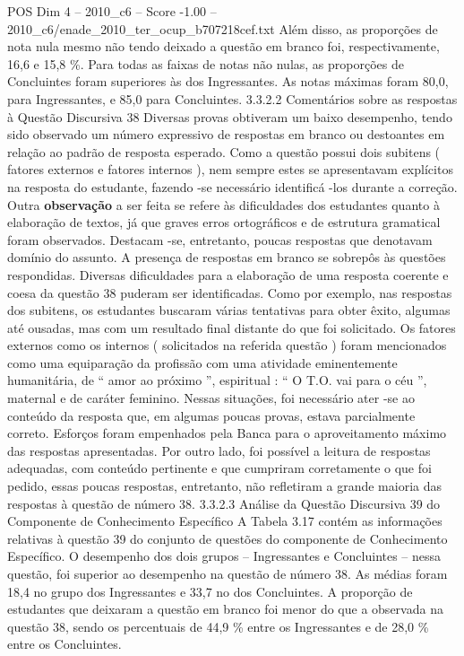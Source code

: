 \begin{textsample}{POS Dim 4 – 2010\_c6 – Score -1.00 – 2010\_c6/enade\_2010\_ter\_ocup\_b707218cef.txt}
Além disso, as proporções de nota nula mesmo não tendo deixado a questão em branco foi, respectivamente, 16,6 e 15,8 \%.
Para todas as faixas de notas não nulas, as proporções de Concluintes foram superiores às dos Ingressantes.
As notas máximas foram 80,0, para Ingressantes, e 85,0 para Concluintes. 3.3.2.2 Comentários sobre as respostas à Questão Discursiva 38 Diversas provas obtiveram um baixo desempenho, tendo sido observado um número expressivo de respostas em branco ou destoantes em relação ao padrão de resposta esperado.
Como a questão possui dois subitens ( fatores externos e fatores internos ), nem sempre estes se apresentavam explícitos na resposta do estudante, fazendo -se necessário identificá -los durante a correção.
Outra \textbf{observação} a ser feita se refere às dificuldades dos estudantes quanto à elaboração de textos, já que graves erros ortográficos e de estrutura gramatical foram observados.
Destacam -se, entretanto, poucas respostas que denotavam domínio do assunto.
A presença de respostas em branco se sobrepôs às questões respondidas.
Diversas dificuldades para a elaboração de uma resposta coerente e coesa da questão 38 puderam ser identificadas.
Como por exemplo, nas respostas dos subitens, os estudantes buscaram várias tentativas para obter êxito, algumas até ousadas, mas com um resultado final distante do que foi solicitado.
Os fatores externos como os internos ( solicitados na referida questão ) foram mencionados como uma equiparação da profissão com uma atividade eminentemente humanitária, de “ amor ao próximo ”, espiritual : “ O T.O. vai para o céu ”, maternal e de caráter feminino.
Nessas situações, foi necessário ater -se ao conteúdo da resposta que, em algumas poucas provas, estava parcialmente correto.
Esforços foram empenhados pela Banca para o aproveitamento máximo das respostas apresentadas.
Por outro lado, foi possível a leitura de respostas adequadas, com conteúdo pertinente e que cumpriram corretamente o que foi pedido, essas poucas respostas, entretanto, não refletiram a grande maioria das respostas à questão de número 38. 3.3.2.3 Análise da Questão Discursiva 39 do Componente de Conhecimento Específico A Tabela 3.17 contém as informações relativas à questão 39 do conjunto de questões do componente de Conhecimento Específico.
O desempenho dos dois grupos – Ingressantes e Concluintes – nessa questão, foi superior ao desempenho na questão de número 38.
As médias foram 18,4 no grupo dos Ingressantes e 33,7 no dos Concluintes.
A proporção de estudantes que deixaram a questão em branco foi menor do que a observada na questão 38, sendo os percentuais de 44,9 \% entre os Ingressantes e de 28,0 \% entre os Concluintes.

\end{textsample}
